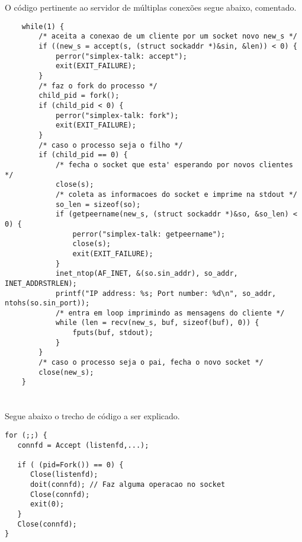\documentclass[a4paper,10pt,oneside,final,titlepage,onecolumn]{article}
\begin{document}
\FloatBarrier
\section{}
\paragraph{}O código pertinente ao servidor de múltiplas conexões segue abaixo, comentado.
\begin{lstlisting}
	while(1) {
		/* aceita a conexao de um cliente por um socket novo new_s */
		if ((new_s = accept(s, (struct sockaddr *)&sin, &len)) < 0) {
			perror("simplex-talk: accept");
			exit(EXIT_FAILURE);
		}
		/* faz o fork do processo */
		child_pid = fork();
		if (child_pid < 0) {
			perror("simplex-talk: fork");
			exit(EXIT_FAILURE);
		}
		/* caso o processo seja o filho */
		if (child_pid == 0) {
			/* fecha o socket que esta' esperando por novos clientes */
			close(s);
			/* coleta as informacoes do socket e imprime na stdout */
			so_len = sizeof(so);
			if (getpeername(new_s, (struct sockaddr *)&so, &so_len) < 0) {
				perror("simplex-talk: getpeername");
				close(s);
				exit(EXIT_FAILURE);
			}
			inet_ntop(AF_INET, &(so.sin_addr), so_addr, INET_ADDRSTRLEN);
			printf("IP address: %s; Port number: %d\n", so_addr, ntohs(so.sin_port));
			/* entra em loop imprimindo as mensagens do cliente */
			while (len = recv(new_s, buf, sizeof(buf), 0)) {
				fputs(buf, stdout);
			}	
		}
		/* caso o processo seja o pai, fecha o novo socket */
		close(new_s);	
	}
\end{lstlisting}



\FloatBarrier
\section{}
\paragraph{}Segue abaixo o trecho de código a ser explicado.
\begin{lstlisting}
for (;;) {
   connfd = Accept (listenfd,...);

   if ( (pid=Fork()) == 0) {
      Close(listenfd);
      doit(connfd); // Faz alguma operacao no socket
      Close(connfd);
      exit(0);
   }
   Close(connfd);
}
\end{lstlisting}
\end{document}
